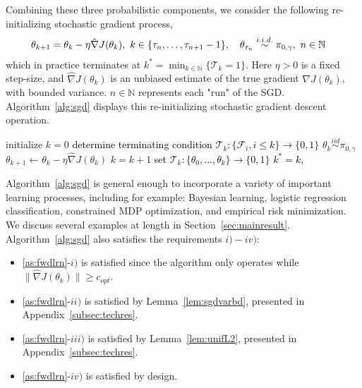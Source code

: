 \documentclass[journal,onecolumn]{IEEEtran}
\newcommand{\thk}{\theta_k}
\newcommand{\thkk}{\theta_{k+1}}
\newcommand{\grad}{\nabla}
\newcommand{\gradn}{\hat{\nabla}}
\newcommand{\rew}{J}
\newcommand{\N}{\mathbb{N}}
\newcommand{\sgdstep}{\eta}
\newcommand{\stn}{\tau_n} %
\newcommand{\stnn}{\tau_{n+1}}
\newcommand{\ids}{\pi}
\newcommand{\idw}{\gamma}
\newcommand{\isp}{0,\idw}
\newcommand{\idistrw}{\ids_{\isp}}
\newcommand{\sgdtm}{c_{opt}}
\newcommand{\ks}{k^*}
\begin{document}
{Combining these three probabilistic components, we consider the following re-initializing stochastic gradient process,
\begin{align}
\begin{split}
\label{eq:sgd}
    &\thkk = \thk - \sgdstep\gradn \rew (\thk), \,\, k \in \{\stn,\dots, \stnn - 1\}, \quad \textcolor{black}{\theta_{\tau_n} \overset{i.i.d.}{\sim} \idistrw, \,\,n\in\mathbb{N}}
\end{split}
\end{align}
which in practice terminates at $\ks = \min_{k\in\N}\{\mathcal{T}_k=1\}$. Here $\sgdstep >0$ is a fixed step-size, and $\gradn\rew(\thk)$ is an unbiased estimate of the true gradient $\grad\rew(\thk)$, with bounded variance. $n\in \N$ represents each "run" of the SGD.  Algorithm~\ref{alg:sgd} displays this re-initializing stochastic gradient descent operation. 



\setlength{\textfloatsep}{5pt}%
\begin{algorithm}%
\caption{Forward Learner. Re-Initializing SGD Process}\label{alg:sgd}
\begin{algorithmic}[1]
\State initialize $k=0$ 
\State \textcolor{black}{determine terminating condition $\mathcal{T}_k: \{\mathcal{F}_i, i\leq k\} \to \{0,1\}$}
    \State $\theta_{k} \overset{iid}{\sim} \idistrw$
    \While{$\|\gradn\rew(\thk)\| \geq \sgdtm$}
        \State $\thkk \gets \thk - \sgdstep\gradn \rew (\thk)$ 
        \State $k = k+1$
        \State \textcolor{black}{set $\mathcal{T}_k: \{\theta_0, \dots,\thk\} \to \{0,1\}$} \textcolor{black}{}
        \textcolor{black}{
        \State $k^* = k$, 
        \EndIf}
    \EndWhile
\EndWhile
\end{algorithmic}
\end{algorithm}

Algorithm~\ref{alg:sgd} is general enough to incorporate a variety of important learning processes, including for example: Bayesian learning, logistic regression classification, constrained MDP optimization, and empirical risk minimization. We discuss several examples at length in Section~\ref{sec:mainresult}.  Algorithm~\ref{alg:sgd} also satisfies the requirements $i)-iv)$:
\begin{itemize}
    \item [-] \ref{as:fwdlrn}-$i)$ is satisfied since the algorithm only operates while $\|\gradn\rew(\thk)\| \geq \sgdtm$.
    \item[-] \ref{as:fwdlrn}-$ii)$ is satisfied by Lemma~\ref{lem:sgdvarbd}, presented in Appendix~\ref{subsec:techres}. 
    \item[-] \ref{as:fwdlrn}-$iii)$ is satisfied by Lemma~\ref{lem:unifL2}, presented in Appendix~\ref{subsec:techres}.
    \item[-] \ref{as:fwdlrn}-$iv)$ is satisfied by design.
\end{itemize}

}
\end{document}
